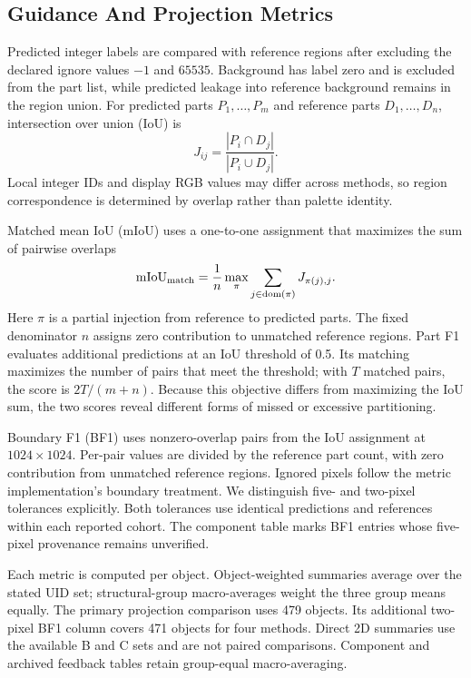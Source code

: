 \documentclass[pdflatex,iicol,sn-apa]{sn-jnl}
\begin{document}
\subsection{Guidance And Projection Metrics}
Predicted integer labels are compared with reference regions after excluding the declared ignore values $-1$ and $65535$. Background has label zero and is excluded from the part list, while predicted leakage into reference background remains in the region union. For predicted parts $P_1,\ldots,P_m$ and reference parts $D_1,\ldots,D_n$, intersection over union (IoU) is
\begin{equation}
J_{ij}=\frac{|P_i\cap D_j|}{|P_i\cup D_j|}.
\label{eq:iou}
\end{equation}
Local integer IDs and display RGB values may differ across methods, so region correspondence is determined by overlap rather than palette identity.

Matched mean IoU (mIoU) uses a one-to-one assignment that maximizes the sum of pairwise overlaps
\begin{equation}
\operatorname{mIoU}_{\rm match}
=\frac{1}{n}\max_{\pi}\sum_{j\in\operatorname{dom}(\pi)}J_{\pi(j),j}.
\label{eq:matched}
\end{equation}
Here $\pi$ is a partial injection from reference to predicted parts. The fixed denominator $n$ assigns zero contribution to unmatched reference regions. Part F1 evaluates additional predictions at an IoU threshold of 0.5. Its matching maximizes the number of pairs that meet the threshold; with $T$ matched pairs, the score is $2T/(m+n)$. Because this objective differs from maximizing the IoU sum, the two scores reveal different forms of missed or excessive partitioning.

Boundary F1 (BF1) uses nonzero-overlap pairs from the IoU assignment at $1024\times1024$. Per-pair values are divided by the reference part count, with zero contribution from unmatched reference regions. Ignored pixels follow the metric implementation's boundary treatment. We distinguish five- and two-pixel tolerances explicitly. Both tolerances use identical predictions and references within each reported cohort. The component table marks BF1 entries whose five-pixel provenance remains unverified.

Each metric is computed per object. Object-weighted summaries average over the stated UID set; structural-group macro-averages weight the three group means equally. The primary projection comparison uses 479 objects. Its additional two-pixel BF1 column covers 471 objects for four methods. Direct 2D summaries use the available B and C sets and are not paired comparisons. Component and archived feedback tables retain group-equal macro-averaging.
\end{document}
